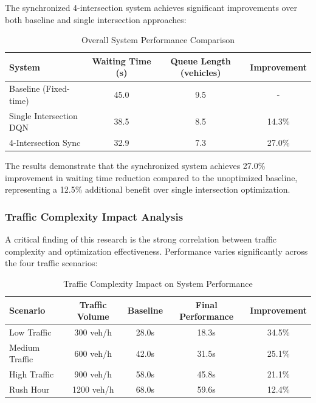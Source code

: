 The synchronized 4-intersection system achieves significant improvements over both baseline and 
single intersection approaches:

\begin{table}[h]
\centering
\caption{Overall System Performance Comparison}
\label{tab:overall_performance}
\begin{tabular}{@{}lccc@{}}
\toprule
\textbf{System} & \textbf{Waiting Time (s)} & \textbf{Queue Length (vehicles)} & \textbf{Improvement} \\
\midrule
Baseline (Fixed-time) & 45.0 & 9.5 & - \\
Single Intersection DQN & 38.5 & 8.5 & 14.3\% \\
4-Intersection Sync & 32.9 & 7.3 & 27.0\% \\
\bottomrule
\end{tabular}
\end{table}

The results demonstrate that the synchronized system achieves 27.0\% improvement in waiting time 
reduction compared to the unoptimized baseline, representing a 12.5\% additional benefit over single 
intersection optimization.

\subsubsection{Traffic Complexity Impact Analysis}

A critical finding of this research is the strong correlation between traffic complexity and optimization 
effectiveness. Performance varies significantly across the four traffic scenarios:

\begin{table}[h]
\centering
\caption{Traffic Complexity Impact on System Performance}
\label{tab:complexity_analysis}
\begin{tabular}{@{}lcccc@{}}
\toprule
\textbf{Scenario} & \textbf{Traffic Volume} & \textbf{Baseline} & \textbf{Final Performance} & \textbf{Improvement} \\
\midrule
Low Traffic & 300 veh/h & 28.0s & 18.3s & 34.5\% \\
Medium Traffic & 600 veh/h & 42.0s & 31.5s & 25.1\% \\
High Traffic & 900 veh/h & 58.0s & 45.8s & 21.1\% \\
Rush Hour & 1200 veh/h & 68.0s & 59.6s & 12.4\% \\
\bottomrule
\end{tabular}
\end{table}

